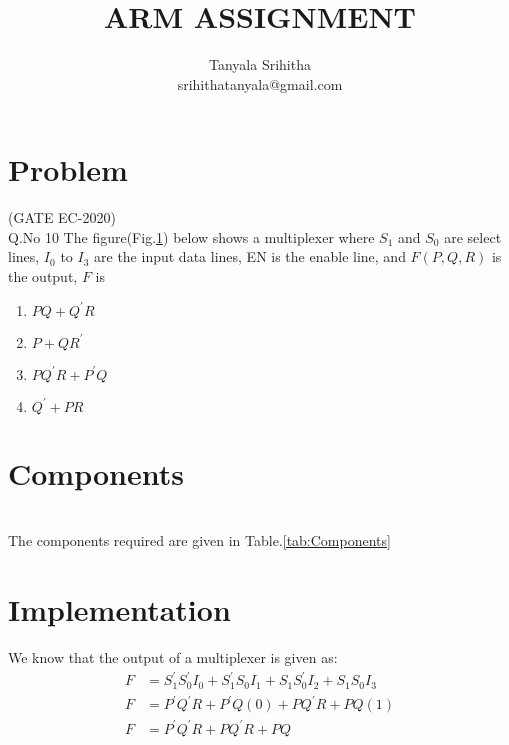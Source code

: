 \documentclass[journal,twocolumn,10pt, a4paper]{article}
\begin{document}
\lstset{ 
  language=C++,
  basicstyle=\ttfamily\footnotesize,
  breaklines=true,
  frame=lines}


\title{ARM ASSIGNMENT}
\author{Tanyala Srihitha\\srihithatanyala@gmail.com}
\maketitle
\tableofcontents 

\section{Problem}                               
(GATE EC-2020)\\                                  
Q.No 10    The figure(Fig.\ref{fig:Fig 1}) below shows a multiplexer where $S_1$ and $S_0$ are select lines, $I_0$ to $I_3$ are the input data lines, EN is the enable line, and $F(P,Q,R)$ is the output, $F$ is
\begin{figure}[!h]

\caption{}
\label{fig:Fig 1}
\end{figure}

\begin{enumerate}
   \item $PQ +{Q^\prime} R$
   \item $P+Q {R^\prime}$
   \item $P{Q^\prime} R+{P^\prime}Q$
   \item ${Q^\prime} +PR$
\end{enumerate}

\section{Components}\\
The components required are given in Table.\ref{tab:Components}
\begin{table}[!h]
\centering

\caption{}
\label{tab:Components}
\end{table}


\section{Implementation}
We know that the output of a multiplexer is given as:
\begin{align}
F&=S_1^\prime S_0^\prime I_0+S_1^\prime S_0I_1+S_1S_0^\prime I_2+S_1S_0I_3\\ 
F&=P^\prime Q^\prime{R}+P^\prime Q(0)+PQ^\prime R+PQ(1)\\
F&=P^\prime Q^\prime R+PQ^\prime R+PQ
\end{align}
\end{document}
